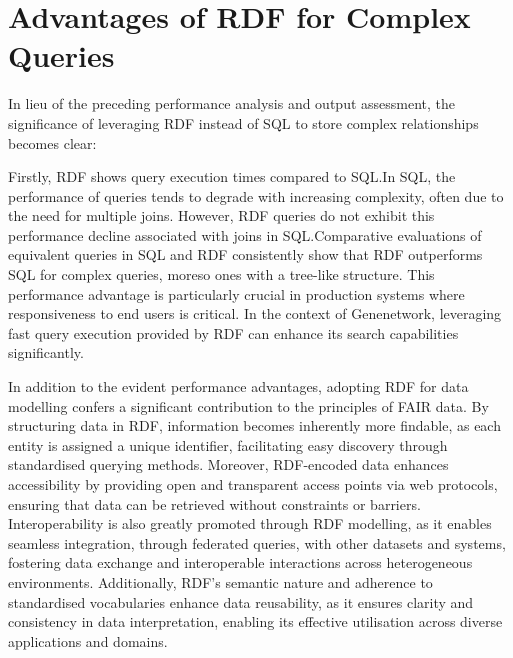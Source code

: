 \section{Advantages of RDF for Complex Queries}

In lieu of the preceding performance analysis and output assessment, the significance of leveraging RDF instead of SQL to store complex relationships becomes clear:

Firstly, RDF shows query execution times compared to SQL.\@  In SQL, the performance of queries tends to degrade with increasing complexity, often due to the need for multiple joins.  However, RDF queries do not exhibit this performance decline associated with joins in SQL.\@  Comparative evaluations of equivalent queries in SQL and RDF consistently show that RDF outperforms SQL for complex queries, moreso ones with a tree-like structure.  This performance advantage is particularly crucial in production systems where responsiveness to end users is critical.  In the context of Genenetwork, leveraging fast query execution provided by RDF can enhance its search capabilities significantly.

In addition to the evident performance advantages, adopting RDF for data modelling confers a significant contribution to the principles of FAIR data.  By structuring data in RDF, information becomes inherently more findable, as each entity is assigned a unique identifier, facilitating easy discovery through standardised querying methods.  Moreover, RDF-encoded data enhances accessibility by providing open and transparent access points via web protocols, ensuring that data can be retrieved without constraints or barriers.  Interoperability is also greatly promoted through RDF modelling, as it enables seamless integration, through federated queries, with other datasets and systems, fostering data exchange and interoperable interactions across heterogeneous environments.  Additionally, RDF's semantic nature and adherence to standardised vocabularies enhance data reusability, as it ensures clarity and consistency in data interpretation, enabling its effective utilisation across diverse applications and domains.

